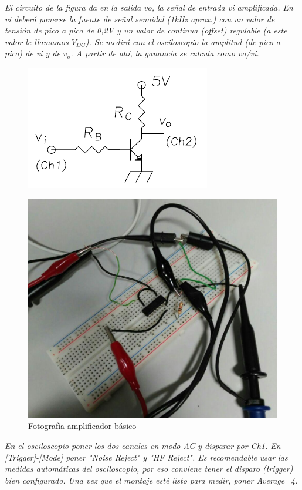 \documentclass[paper=a4, fontsize=11pt]{scrartcl} %
\numberwithin{equation}{section} %
\numberwithin{figure}{section} %
\numberwithin{table}{section} %
\begin{document}
\textit{El circuito de la figura da en la salida vo, la señal de entrada vi amplificada. En vi deberá ponerse la fuente de señal  senoidal (1kHz aprox.) con un valor de tensión de pico a pico de 0,2V y un valor de continua (offset) regulable (a este valor le llamamos $ V_{DC} $). Se medirá con el osciloscopio la amplitud (de pico a pico) de vi y de $ v_{o} $. A partir de ahí, la ganancia se calcula como vo/vi.} \newline

\begin{figure}[H]
\centering
\includegraphics[width=0.5\linewidth]{image/5b}
\label{fig:5b}
\end{figure}

\begin{figure}[H]
	\centering
	\includegraphics[scale=0.4]{image/transistorB}
	\caption{Fotografía amplificador básico}
	\label{fig:foto-transistorB}
\end{figure}

\textit{En el osciloscopio poner los dos canales en modo AC y disparar por Ch1. En [Trigger]-[Mode] poner  "Noise Reject" y "HF Reject". Es recomendable usar las medidas automáticas del osciloscopio, por eso conviene tener el disparo (trigger) bien configurado. Una vez que el montaje esté listo para medir, poner Average=4.} \newline
\end{document}
